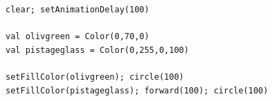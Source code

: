   

\begin{lstlisting}[basicstyle={\ttfamily\fontsize{16}{19}\selectfont},numbers=none]
clear; setAnimationDelay(100)      

val olivgreen = Color(0,70,0)
val pistageglass = Color(0,255,0,100)

setFillColor(olivgreen); circle(100)
setFillColor(pistageglass); forward(100); circle(100)
\end{lstlisting}
        
